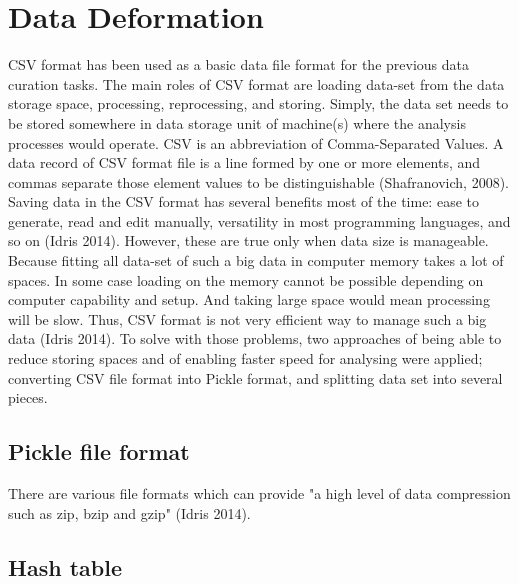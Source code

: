 \documentclass[12pt,a4paper]{report}
\begin{document}
\section{Data Deformation}
CSV format has been used as a basic data file format for the previous data curation tasks. The main roles of CSV format are loading data-set from the data storage space, processing, reprocessing, and storing. Simply, the data set needs to be stored somewhere in data storage unit of machine(s) where the analysis processes would operate. CSV is an abbreviation of Comma-Separated Values. A data record of CSV format file is a line formed by one or more elements, and commas separate those element values to be distinguishable (Shafranovich, 2008). Saving data in the CSV format has several benefits most of the time: ease to generate, read and edit manually, versatility in most programming languages, and so on (Idris 2014). However, these are true only when data size is manageable. Because fitting all data-set of such a big data in computer memory takes a lot of spaces. In some case loading on the memory cannot be possible depending on computer capability and setup. And taking large space would mean processing will be slow. Thus, CSV format is not very efficient way to manage such a big data (Idris 2014). To solve with those problems, two approaches of being able to reduce storing spaces and of enabling faster speed for analysing were applied; converting CSV file format into Pickle format, and splitting data set into several pieces.

\subsection{Pickle file format}
There are various file formats which can provide "a high level of data compression such as zip, bzip and gzip" (Idris 2014). 

\subsection{Hash table}
\end{document}
